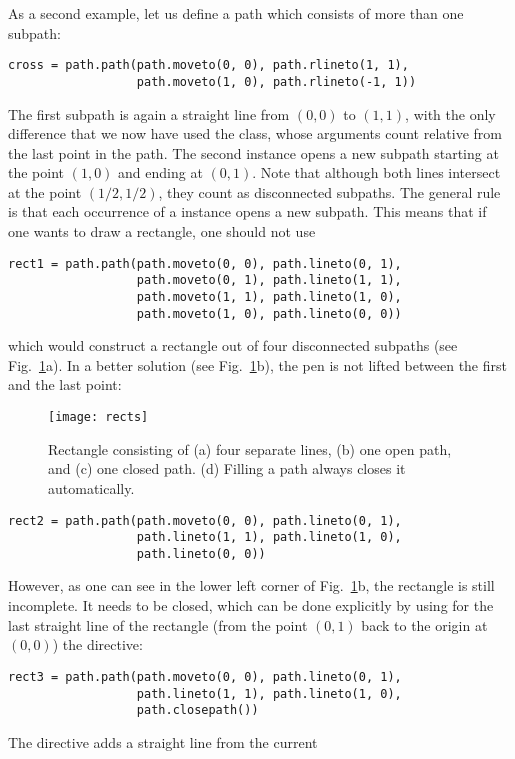 As a second example, let us define a path which consists of more than 
one subpath:
\begin{verbatim}
cross = path.path(path.moveto(0, 0), path.rlineto(1, 1),
                  path.moveto(1, 0), path.rlineto(-1, 1))
\end{verbatim}
The first subpath is again a straight line from $(0, 0)$ to $(1, 1)$,
with the only difference that we now have used the 
class, whose arguments count relative from the last point in the path.
The second  instance opens a new subpath starting at the
point $(1, 0)$ and ending at $(0, 1)$. Note that although both lines
intersect at the point $(1/2, 1/2)$, they count as disconnected
subpaths.  The general rule is that each occurrence of a 
instance opens a new subpath. This means that if one wants to draw a
rectangle, one should not use
\begin{verbatim}
rect1 = path.path(path.moveto(0, 0), path.lineto(0, 1),
                  path.moveto(0, 1), path.lineto(1, 1),
                  path.moveto(1, 1), path.lineto(1, 0),
                  path.moveto(1, 0), path.lineto(0, 0))
\end{verbatim}
which would construct a rectangle out of four disconnected
subpaths (see Fig.~\ref{fig:rects}a). In a better solution (see
Fig.~\ref{fig:rects}b), the pen is not lifted between the first and
the last point:
%
\begin{figure}
\centerline{\texttt{[image: rects]}}
\caption{Rectangle consisting of (a) four separate lines, (b) one open
  path, and (c) one closed path. (d) Filling a
  path always closes it automatically.}
\label{fig:rects}
\end{figure}
%
\begin{verbatim}
rect2 = path.path(path.moveto(0, 0), path.lineto(0, 1), 
                  path.lineto(1, 1), path.lineto(1, 0),
                  path.lineto(0, 0))
\end{verbatim}
However, as one can see in the lower left corner of
Fig.~\ref{fig:rects}b, the rectangle is still incomplete.  It needs to
be closed, which can  be done explicitly by using for the last straight
line of the rectangle (from the point $(0, 1)$ back to the origin at $(0, 0)$)
the  directive:
\begin{verbatim}
rect3 = path.path(path.moveto(0, 0), path.lineto(0, 1), 
                  path.lineto(1, 1), path.lineto(1, 0),
                  path.closepath())
\end{verbatim}
The  directive adds a straight line from the current
